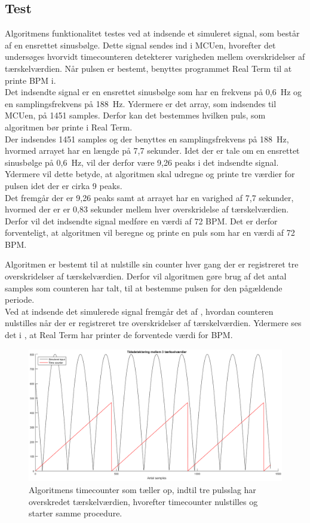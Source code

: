 {\subsection{Test}
Algoritmens funktionalitet testes ved at indsende et simuleret signal, som består af en ensrettet sinusbølge. Dette signal sendes ind i MCUen, hvorefter det undersøges hvorvidt timecounteren detekterer varigheden mellem overskridelser af tærskelværdien. Når pulsen er bestemt, benyttes programmet Real Term til at printe BPM i. \\
Det indsendte signal er en ensrettet sinusbølge som har en frekvens på 0,6~Hz og en samplingsfrekvens på 188~Hz. Ydermere er det array, som indsendes til MCUen, på 1451 samples. Derfor kan det bestemmes hvilken puls, som algoritmen bør printe i Real Term. \\
Der indsendes 1451 samples og der benyttes en samplingsfrekvens på 188~Hz, hvormed arrayet har en længde på 7,7 sekunder. Idet der er tale om en ensrettet sinusbølge på 0,6~Hz, vil der derfor være 9,26 peaks i det indsendte signal. Ydermere vil dette betyde, at algoritmen skal udregne og printe tre værdier for pulsen idet der er cirka 9 peaks. \\
Det fremgår der er 9,26 peaks samt at arrayet har en varighed af 7,7 sekunder, hvormed der er er 0,83 sekunder mellem hver overskridelse af tærskelværdien. Derfor vil det indsendte signal medføre en værdi af 72 BPM. Det er derfor forventeligt, at algoritmen vil beregne og printe en puls som har en værdi af 72 BPM. 

Algoritmen er bestemt til at nulstille sin counter hver gang der er registreret tre overskridelser af tærskelværdien. Derfor vil algoritmen gøre brug af det antal samples som counteren har talt, til at bestemme pulsen for den pågældende periode. \\
Ved at indsende det simulerede signal fremgår det af , hvordan counteren nulstilles når der er registreret tre overskridelser af tærskelværdien. Ydermere ses det i , at Real Term har printer de forventede værdi for BPM.

\begin{figure}[H]
	\centering
	\includegraphics[scale=0.46]{figures/cDesign/timecounter_puls_pic.png}
	\caption{Algoritmens timecounter som tæller op, indtil tre pulsslag har overskredet tærskelværdien, hvorefter timecounter nulstilles og starter samme procedure.}
\label{fig:timecounter_puls_realterm}
\end{figure}

}
